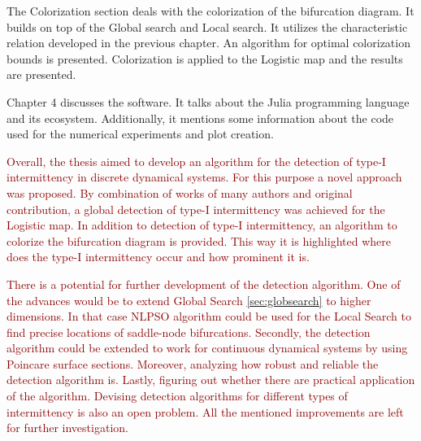 The Colorization section deals with the colorization of the bifurcation diagram.
It builds on top of the Global search and Local search.
It utilizes the characteristic relation developed in the previous chapter.
An algorithm for optimal colorization bounds is presented.
Colorization is applied to the Logistic map and the results are presented.
\par
Chapter 4 discusses the software.
It talks about the Julia programming language and its ecosystem.
Additionally, it mentions some information about the code used for the numerical experiments and plot creation.
\par
\textcolor{darkred}{
Overall, the thesis aimed to develop an algorithm for the detection of type-I intermittency in discrete dynamical systems.
For this purpose a novel approach was proposed.
By combination of works of many authors and original contribution, a global detection of type-I intermittency was achieved for the Logistic map.
In addition to detection of type-I intermittency, an algorithm to colorize the bifurcation diagram is provided.
This way it is highlighted where does the type-I intermittency occur and how prominent it is.
}
\par
\textcolor{darkred}{
There is a potential for further development of the detection algorithm.
One of the advances would be to extend Global Search \ref{sec:globsearch} to higher dimensions.
In that case NLPSO algorithm could be used for the Local Search to find precise locations of saddle-node bifurcations.
Secondly, the detection algorithm could be extended to work for continuous dynamical systems by using Poincare surface sections.
Moreover, analyzing how robust and reliable the detection algorithm is.
Lastly, figuring out whether there are practical application of the algorithm.
Devising detection algorithms for different types of intermittency is also an open problem.
All the mentioned improvements are left for further investigation.
}

\endinput
